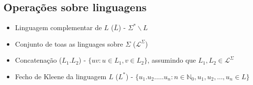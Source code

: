 \documentclass{article}
\begin{document}
\subsection{Operações sobre linguagens}

\begin{itemize}
    \item Linguagem complementar de $L$ ($\bar{L}$) - $\Sigma^*\backslash L$
    \item Conjunto de toas as linguages sobre $\Sigma$ ($\mathcal{L}^\Sigma$)
    \item Concatenação ($L_1.L_2$) - $\{uv : u \in L_1, v \in L_2\}$, assumindo que $L_1,L_2 \in \mathcal{L}^\Sigma$
    \item Fecho de Kleene da linguagem $L$ ($L^*$) - $\{u_1.u_2.\dots.u_n : n \in \mathbb{N}_0, u_1, u_2,\dots,u_n \in L\}$
\end{itemize}
\end{document}
